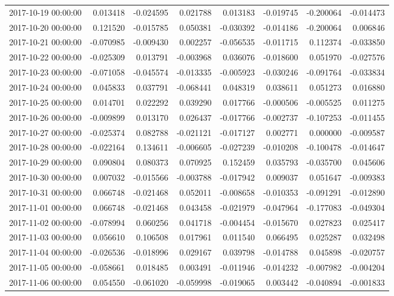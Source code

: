 \begin{tabular}{lrrrrrrr}
2017-10-19 00:00:00 & 0.013418 & -0.024595 & 0.021788 & 0.013183 & -0.019745 & -0.200064 & -0.014473 \\
2017-10-20 00:00:00 & 0.121520 & -0.015785 & 0.050381 & -0.030392 & -0.014186 & -0.200064 & 0.006846 \\
2017-10-21 00:00:00 & -0.070985 & -0.009430 & 0.002257 & -0.056535 & -0.011715 & 0.112374 & -0.033850 \\
2017-10-22 00:00:00 & -0.025309 & 0.013791 & -0.003968 & 0.036076 & -0.018600 & 0.051970 & -0.027576 \\
2017-10-23 00:00:00 & -0.071058 & -0.045574 & -0.013335 & -0.005923 & -0.030246 & -0.091764 & -0.033834 \\
2017-10-24 00:00:00 & 0.045833 & 0.037791 & -0.068441 & 0.048319 & 0.038611 & 0.051273 & 0.016880 \\
2017-10-25 00:00:00 & 0.014701 & 0.022292 & 0.039290 & 0.017766 & -0.000506 & -0.005525 & 0.011275 \\
2017-10-26 00:00:00 & -0.009899 & 0.013170 & 0.026437 & -0.017766 & -0.002737 & -0.107253 & -0.011455 \\
2017-10-27 00:00:00 & -0.025374 & 0.082788 & -0.021121 & -0.017127 & 0.002771 & 0.000000 & -0.009587 \\
2017-10-28 00:00:00 & -0.022164 & 0.134611 & -0.006605 & -0.027239 & -0.010208 & -0.100478 & -0.014647 \\
2017-10-29 00:00:00 & 0.090804 & 0.080373 & 0.070925 & 0.152459 & 0.035793 & -0.035700 & 0.045606 \\
2017-10-30 00:00:00 & 0.007032 & -0.015566 & -0.003788 & -0.017942 & 0.009037 & 0.051647 & -0.009383 \\
2017-10-31 00:00:00 & 0.066748 & -0.021468 & 0.052011 & -0.008658 & -0.010353 & -0.091291 & -0.012890 \\
2017-11-01 00:00:00 & 0.066748 & -0.021468 & 0.043458 & -0.021979 & -0.047964 & -0.177083 & -0.049304 \\
2017-11-02 00:00:00 & -0.078994 & 0.060256 & 0.041718 & -0.004454 & -0.015670 & 0.027823 & 0.025417 \\
2017-11-03 00:00:00 & 0.056610 & 0.106508 & 0.017961 & 0.011540 & 0.066495 & 0.025287 & 0.032498 \\
2017-11-04 00:00:00 & -0.026536 & -0.018996 & 0.029167 & 0.039798 & -0.014788 & 0.045898 & -0.020757 \\
2017-11-05 00:00:00 & -0.058661 & 0.018485 & 0.003491 & -0.011946 & -0.014232 & -0.007982 & -0.004204 \\
2017-11-06 00:00:00 & 0.054550 & -0.061020 & -0.059998 & -0.019065 & 0.003442 & -0.040894 & -0.001833 \\

\end{tabular}
